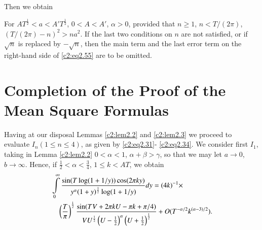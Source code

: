 Then we obtain
\begin{lemma}\label{c2:lem2.3}
  For $AT^{\frac{1}{2}}< a < A'T^{\frac{1}{2}}$, $0 < A < A'$, $\alpha
  > 0$,
  {}
  provided that $n \geq 1$, $n < T/(2 \pi)$, $(T/(2 \pi)-n)^2>
  na^2$. If the last two conditions on $n$ are not satisfied, or if
  $\sqrt{n}$ is replaced by $- \sqrt{n}$, then the main term and the
  last error term on the right-hand side of \eqref{c2:eq2.55} are to
  be omitted.
\end{lemma}

\section{Completion of the Proof of the Mean Square
  Formulas}\label{c2:sec2.5}

Having at our disposal Lemmas \ref{c2:lem2.2} and \ref{c2:lem2.3} we
proceed to evaluate $I_n (1 \leq n \leq 4)$, as given by
\eqref{c2:eq2.31}- \eqref{c2:eq2.34}. We consider first $I_1$, taking
in Lemma \ref{c2:lem2.2} $0 < \alpha < 1$, $\alpha + \beta > \gamma$,
so that we may let $a \to 0$, $b \to \infty$. Hence, if
$\frac{1}{2} < \alpha < \frac{3}{4}$, $1 \leq k < AT$, we
obtain 
\begin{align}
&\int\limits_0^\infty \frac{\sin (T \log (1+ 1/y)) \cos (2 \pi
ky)}{y^\alpha (1+ y)^{\frac{1}{2}} \log (1+
1/y)}dy = (4k)^{-1}\times \notag\\
&\quad\left(\frac{T}{\pi} \right)^{\frac{1}{2}} \frac{\sin (TV
+ 2 \pi k U - \pi k+ \pi/4)}{VU^{\frac{1}{2}}\left(U-
\frac{1}{2}\right)^\alpha \left(U+ \frac{1}{2}
\right)^{\frac{1}{2}}} + O(T^{- \alpha/2}k^{(\alpha-3)/2}).\label{c2:eq2.56}
\end{align}


